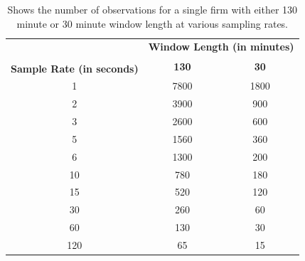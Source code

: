 \begin{table}[!htb]
\centering
\begin{tabular}{c|c|c|}
\cline{2-3}
\textbf{}                                      & \multicolumn{2}{c|}{\textbf{Window Length (in minutes)}}                 \\ \cline{2-3} 
\multirow{2}{*}{\textbf{}}                     & \multirow{3}{*}{{\textbf{130}}} & \multirow{3}{*}{{\textbf{30}}} \\
                                               &                                     &                                    \\ \cline{1-1}
\multicolumn{1}{|l|}{\textbf{Sample Rate (in seconds)}} &                                     &                                    \\ \hline
\multicolumn{1}{|c|}{1}                        & 7800                                & 1800                               \\ \hline
\multicolumn{1}{|c|}{2}                        & 3900                                & 900                                \\ \hline
\multicolumn{1}{|c|}{3}                        & 2600                                & 600                                \\ \hline
\multicolumn{1}{|c|}{5}                        & 1560                                & 360                                \\ \hline
\multicolumn{1}{|c|}{6}                        & 1300                                & 200                                \\ \hline
\multicolumn{1}{|c|}{10}                       & 780                                 & 180                                \\ \hline
\multicolumn{1}{|c|}{15}                       & 520                                 & 120                                \\ \hline
\multicolumn{1}{|c|}{30}                       & 260                                 & 60                                 \\ \hline
\multicolumn{1}{|c|}{60}                       & 130                                 & 30                                 \\ \hline
\multicolumn{1}{|c|}{120}                      & 65                                  & 15                                 \\ \hline
\end{tabular}
\label{tab:WindowLength}
\caption{Shows the number of observations for a single firm with either 130 minute or 30 minute window length at various sampling rates.}
\end{table}



\clearpage

